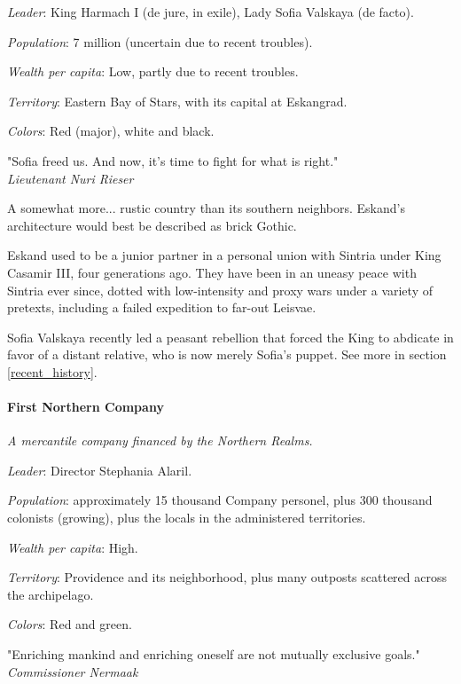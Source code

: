 \textit{Leader}: King Harmach I (de jure, in exile), Lady Sofia Valskaya (de facto).

\textit{Population}: 7 million (uncertain due to recent troubles).

\textit{Wealth per capita}: Low, partly due to recent troubles.

\textit{Territory}: Eastern Bay of Stars, with its capital at Eskangrad.
    
\textit{Colors}: Red (major), white and black.


\begin{rpg-quotebox}
"Sofia freed us. And now, it's time to fight for what is right." \\ \textendash \textit{Lieutenant Nuri Rieser}
\end{rpg-quotebox}


A somewhat more... rustic country than its southern neighbors. Eskand's architecture would best be described as brick Gothic.

Eskand used to be a junior partner in a personal union with Sintria under King Casamir III, four generations ago. They have been in an uneasy peace with Sintria ever since, dotted with low-intensity and proxy wars under a variety of pretexts, including a failed expedition to far-out Leisvae.

Sofia Valskaya recently led a peasant rebellion that forced the King to abdicate in favor of a distant relative, who is now merely Sofia's puppet. See more in section \ref{recent_history}.



\paragraph{First Northern Company}


\textit{A mercantile company financed by the Northern Realms.}

\textit{Leader}: Director Stephania Alaril.

\textit{Population}: approximately 15 thousand Company personel, plus 300 thousand colonists (growing), plus the locals in the administered territories.

\textit{Wealth per capita}: High.

\textit{Territory}: Providence and its neighborhood, plus many outposts scattered across the archipelago.
    
\textit{Colors}: Red and green.


\begin{rpg-quotebox}
"Enriching mankind and enriching oneself are not mutually exclusive goals." \\ \textendash \textit{Commissioner Nermaak}
\end{rpg-quotebox}



